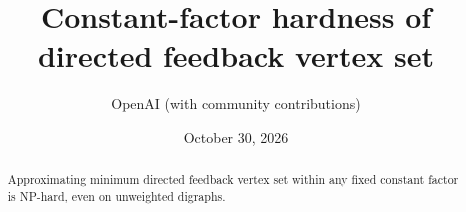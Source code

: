 \documentclass[11pt]{article}
\title{Constant-factor hardness of\\directed feedback vertex set}
\author{OpenAI (with community contributions)}
\date{October 30, 2026}
\theoremstyle{definition}
\theoremstyle{remark}
\numberwithin{equation}{section}
\begin{document}
\maketitle
\begin{abstract}
Approximating minimum directed feedback vertex set within any fixed
constant factor is NP-hard, even on unweighted digraphs.
\end{abstract}
\tableofcontents









\par
\begingroup
\small

\endgroup
\end{document}
